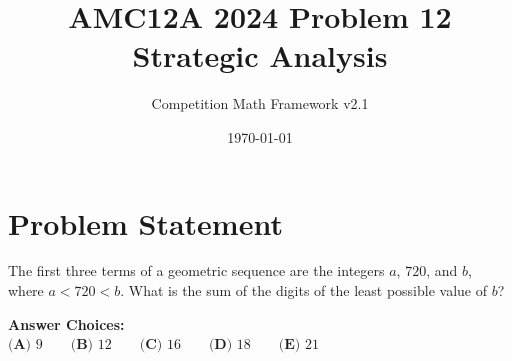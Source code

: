 \documentclass[11pt]{article}
\begin{document}
\title{\textbf{AMC12A 2024 Problem 12\\Strategic Analysis}}
\author{Competition Math Framework v2.1}
\date{\today}
\maketitle

\section*{Problem Statement}

The first three terms of a geometric sequence are the integers $a$, $720$, and $b$, where $a < 720 < b$. What is the sum of the digits of the least possible value of $b$?

\vspace{0.5em}
\textbf{Answer Choices:}\\
$\textbf{(A) } 9 \qquad \textbf{(B) } 12 \qquad \textbf{(C) } 16 \qquad \textbf{(D) } 18 \qquad \textbf{(E) } 21$
\end{document}

